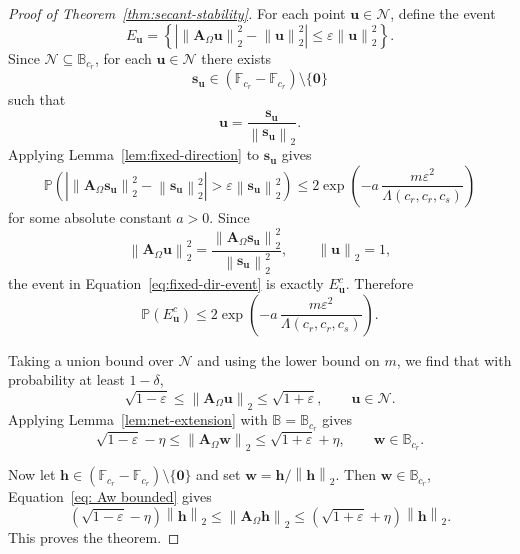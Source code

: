 \documentclass{article}
\theoremstyle{plain}
\theoremstyle{definition}
\theoremstyle{remark}
\begin{document}
\begin{proof}[Proof of Theorem~\ref{thm:secant-stability}]
  For each point $\mathbf u\in\mathcal N$, define the event
  \[
    E_{\mathbf u}
    =
    \left\{
      \left|
      \left\|\mathbf A_\Omega\mathbf u\right\|_2^2
      -
      \left\|\mathbf u\right\|_2^2
      \right|
      \leq
      \varepsilon\left\|\mathbf u\right\|_2^2
    \right\}.
  \]
  Since $\mathcal N\subseteq \mathbb B_{c_r}$, for each
  $\mathbf u\in\mathcal N$ there exists
  \[
    \mathbf s_{\mathbf u}
    \in
    \left(\mathbb F_{c_r}-\mathbb F_{c_r}\right)
    \setminus\{\mathbf 0\}
  \]
  such that
  \[
    \mathbf u
    =
    \frac{\mathbf s_{\mathbf u}}
    {\left\|\mathbf s_{\mathbf u}\right\|_2}.
  \]
  Applying Lemma~\ref{lem:fixed-direction} to $\mathbf s_{\mathbf u}$ gives
      \begin{equation}\label{eq:fixed-dir-event}
      \mathbb P\left(
        \left|
        \left\|\mathbf A_\Omega \mathbf s_{\mathbf u}\right\|_2^2
        -
        \left\|\mathbf s_{\mathbf u}\right\|_2^2
        \right|
        >
        \varepsilon\left\|\mathbf s_{\mathbf u}\right\|_2^2
      \right)
      \leq
      2\exp\left(
        -a\,\frac{m\varepsilon^2}{\Lambda(c_r,c_r,c_s)}
      \right)
    \end{equation}
  for some absolute constant $a>0$. Since
  \[
    \left\|\mathbf A_\Omega \mathbf u\right\|_2^2
    =
    \frac{\left\|\mathbf A_\Omega \mathbf s_{\mathbf u}\right\|_2^2}
    {\left\|\mathbf s_{\mathbf u}\right\|_2^2},
    \qquad
    \left\|\mathbf u\right\|_2=1,
  \]
  the event in Equation~\eqref{eq:fixed-dir-event} is exactly $E_{\mathbf u}^c$. Therefore
  \[
    \mathbb P\left(E_{\mathbf u}^c\right)
    \leq
    2\exp\left(
      -a\,\frac{m\varepsilon^2}{\Lambda(c_r,c_r,c_s)}
    \right).
  \]

  Taking a union bound over $\mathcal N$ and using the lower bound on $m$,
  we find that with probability at least $1-\delta$,
  \[
    \sqrt{1-\varepsilon}
    \leq
    \left\|\mathbf A_\Omega\mathbf u\right\|_2
    \leq
    \sqrt{1+\varepsilon},
    \qquad
    \mathbf u\in\mathcal N.
  \]
  Applying Lemma~\ref{lem:net-extension} with
  $\mathbb B=\mathbb B_{c_r}$ gives
  \begin{equation}\label{eq: Aw bounded}
    \sqrt{1-\varepsilon}-\eta
    \leq
    \left\|\mathbf A_\Omega\mathbf w\right\|_2
    \leq
    \sqrt{1+\varepsilon}+\eta,
    \qquad
    \mathbf w\in\mathbb B_{c_r}.
  \end{equation}

  Now let $\mathbf h \in (\mathbb F_{c_r}-\mathbb F_{c_r}) \setminus \{ \mathbf 0 \}$ and set
  $
    \mathbf w
    =
    \mathbf h / \left\|\mathbf h\right\|_2.
  $
  Then $\mathbf w\in\mathbb B_{c_r}$, Equation~\eqref{eq: Aw bounded} gives
  \[
    \left(\sqrt{1-\varepsilon}-\eta\right)\left\|\mathbf h\right\|_2
    \leq
    \left\|\mathbf A_\Omega \mathbf h\right\|_2
    \leq
    \left(\sqrt{1+\varepsilon}+\eta\right)\left\|\mathbf h\right\|_2.
  \]
  This proves the theorem.
\end{proof}
\end{document}
